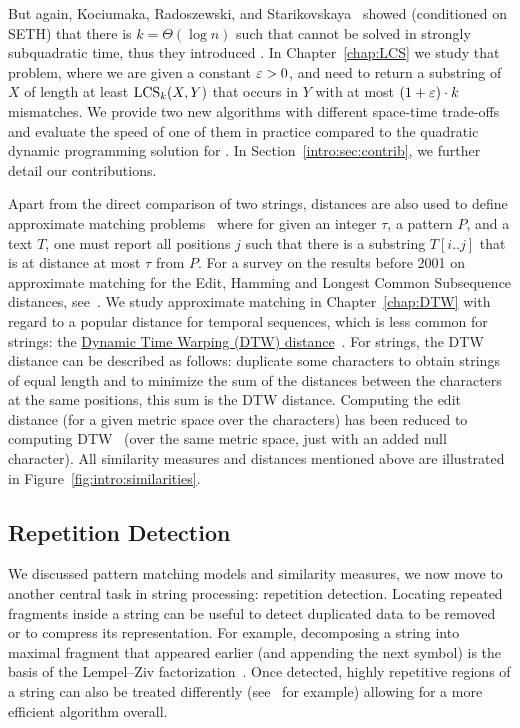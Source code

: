 But again, Kociumaka, Radoszewski, and Starikovskaya~\cite{DBLP:journals/algorithmica/KociumakaRS19} showed (conditioned on SETH) that there is $k=\Theta(\log n)$ such that \kLCS cannot be solved in strongly subquadratic time, thus they introduced \kApproxLCS.
In Chapter~\ref{chap:LCS} we study that problem, where we are given a constant $\varepsilon > 0$, and need to return a substring of $X$ of length at least $\mathrm{LCS}_{k}(X,Y)$ that occurs in $Y$ with at most $(1+\varepsilon) \cdot k$ mismatches. We provide two new algorithms with different space-time trade-offs and evaluate the speed of one of them in practice compared to the quadratic dynamic programming solution for \kLCS. In Section~\ref{intro:sec:contrib}, we further detail our contributions.

Apart from the direct comparison of two strings, distances are also used to define approximate matching problems~\cite{landau1986efficient,landau1989fast} where for given an integer $\tau$, a pattern $P$, and a text $T$, one must report all positions $j$ such that there is a substring $T[i..j]$ that is at distance at most $\tau$ from $P$.
For a survey on the results before 2001 on approximate matching for the Edit, Hamming and Longest Common Subsequence distances, see~\cite{navarro2001guided}.
We study approximate matching in Chapter~\ref{chap:DTW} with regard to a popular distance for temporal sequences, which is less common for strings: the \underline{Dynamic Time Warping (DTW) distance}~\cite{sakoe1978dynamic}. For strings, the DTW distance can be described as follows: duplicate some characters to obtain strings of equal length and to minimize the sum of the distances between the characters at the same positions, this sum is the DTW distance. Computing the edit distance (for a given metric space over the characters) has been reduced to computing DTW~\cite{DBLP:conf/icalp/Kuszmaul19} (over the same metric space, just with an added null character).
%
All similarity measures and distances mentioned above are illustrated in Figure~\ref{fig:intro:similarities}.



\subsection{Repetition Detection}

We discussed pattern matching models and similarity measures, we now move to another central task in string processing: repetition detection. Locating repeated fragments inside a string can be useful to detect duplicated data to be removed or to compress its representation. For example, decomposing a string into maximal fragment that appeared earlier (and appending the next symbol) is the basis of the Lempel--Ziv factorization~\cite{ziv1977universal}. Once detected, highly repetitive regions of a string can also be treated differently (see~\cite{Porat:09} for example) allowing for a more efficient algorithm overall.

